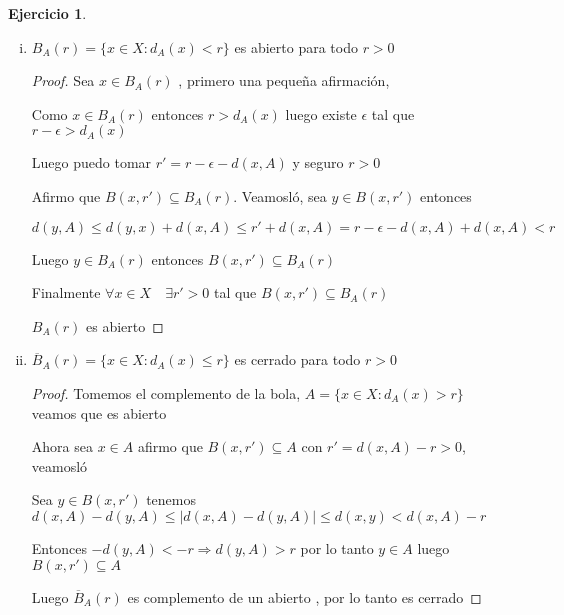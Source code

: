 \documentclass[12pt]{article}
\newcommand{\Ra}{\Rightarrow}
\newcommand{\ol}{\overline}
\theoremstyle{definition}
\newtheorem{ej}{Ejercicio}
\begin{document}
\begin{ej}
\begin{enumerate}[i.]
\begin{proof}
	     $\iff x \in \ol A$
	  \end{proof}
    \item $B_A(r) = \{x \in X : d_A(x) < r \}$ es abierto para todo $r>0$
      \begin{proof}
	Sea $x \in B_A(r)$ , primero una pequeña afirmación, 

	Como $x \in B_A(r)$ entonces $r > d_A(x) $ luego existe $\epsilon$ tal que $r - \epsilon > d_A(x)$

	Luego puedo tomar $r' = r  - \epsilon - d(x,A)$ y seguro $r > 0$

	Afirmo que $B(x,r') \subseteq B_A(r)$. Veamosló, sea $y \in B(x,r')$ entonces 

	$d(y,A) \leq d(y,x) + d(x,A) \leq r' + d(x,A) = r - \epsilon - d(x,A) + d(x,A) <r$

	Luego $y \in B_A(r)$ entonces $B(x,r') \subseteq B_A(r)$ 

	Finalmente $\forall x \in X \quad \exists r' >0 $ tal que $B(x,r') \subseteq B_A(r)$ 

	$B_A(r)$ es abierto
      \end{proof}
    \item $\ol B_{A}(r) = \{x \in X : d_A(x) \leq r\} $ es cerrado para todo $r>0$
      \begin{proof}
	Tomemos el complemento de la bola, $A = \{x \in X : d_A(x) > r\}$ veamos que es abierto

	Ahora sea $x \in A$ afirmo que $B(x,r') \subseteq A$ con $r' = d(x,A) - r > 0 $, veamosló

	Sea $y \in B(x,r')$ tenemos $d(x,A) - d(y,A) \leq |d(x,A) - d(y,A)| \leq d(x,y) < d(x,A) -r $

      Entonces $-d(y,A) < -r \Ra d(y,A) > r$ por lo tanto $y \in A$ luego $B(x,r') \subseteq A$

      Luego $\ol B_A(r)$ es complemento de un abierto , por lo tanto es cerrado
      \end{proof}
  \end{enumerate}
\end{ej}
\end{document}
